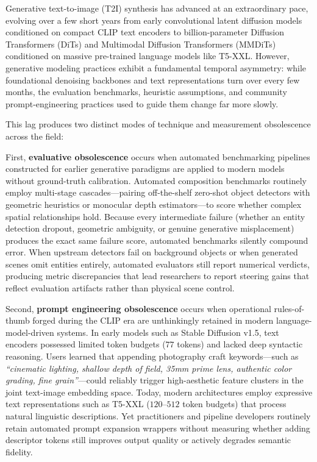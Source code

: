 \documentclass[10pt,twocolumn,letterpaper]{article}
\begin{document}
Generative text-to-image (T2I) synthesis has advanced at an extraordinary pace, evolving over a few short years from early convolutional latent diffusion models conditioned on compact CLIP text encoders to billion-parameter Diffusion Transformers (DiTs) and Multimodal Diffusion Transformers (MMDiTs) conditioned on massive pre-trained language models like T5-XXL. However, generative modeling practices exhibit a fundamental temporal asymmetry: while foundational denoising backbones and text representations turn over every few months, the evaluation benchmarks, heuristic assumptions, and community prompt-engineering practices used to guide them change far more slowly.

This lag produces two distinct modes of technique and measurement obsolescence across the field:

First, \textbf{evaluative obsolescence} occurs when automated benchmarking pipelines constructed for earlier generative paradigms are applied to modern models without ground-truth calibration. Automated composition benchmarks routinely employ multi-stage cascades---pairing off-the-shelf zero-shot object detectors with geometric heuristics or monocular depth estimators---to score whether complex spatial relationships hold. Because every intermediate failure (whether an entity detection dropout, geometric ambiguity, or genuine generative misplacement) produces the exact same failure score, automated benchmarks silently compound error. When upstream detectors fail on background objects or when generated scenes omit entities entirely, automated evaluators still report numerical verdicts, producing metric discrepancies that lead researchers to report steering gains that reflect evaluation artifacts rather than physical scene control.

Second, \textbf{prompt engineering obsolescence} occurs when operational rules-of-thumb forged during the CLIP era are unthinkingly retained in modern language-model-driven systems. In early models such as Stable Diffusion v1.5, text encoders possessed limited token budgets ($77$ tokens) and lacked deep syntactic reasoning. Users learned that appending photography craft keywords---such as \textit{``cinematic lighting, shallow depth of field, 35mm prime lens, authentic color grading, fine grain''}---could reliably trigger high-aesthetic feature clusters in the joint text-image embedding space. Today, modern architectures employ expressive text representations such as T5-XXL ($120\text{--}512$ token budgets) that process natural linguistic descriptions. Yet practitioners and pipeline developers routinely retain automated prompt expansion wrappers without measuring whether adding descriptor tokens still improves output quality or actively degrades semantic fidelity.
\end{document}
